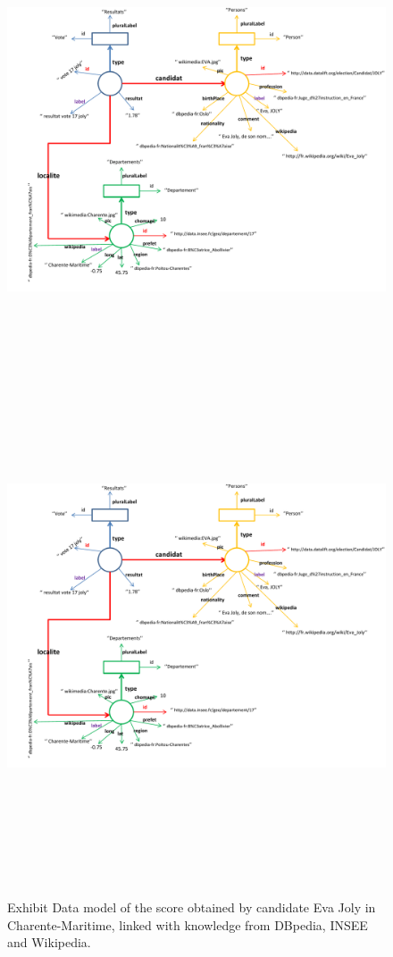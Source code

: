 \documentclass[a4paper,11pt]{report}
\begin{document}
\begin{landscape}
\begin{figure}[!htbp]
  \begin{center}
    \ifpdf
      \includegraphics[height=5in]{model_EvaJoly_data}
    \else
      \includegraphics[bb = 92 86 545 742, height=6in]{model_EvaJoly_data}
    \fi
    \caption{Exhibit Data model of the score obtained by candidate Eva Joly in Charente-Maritime, linked with knowledge from DBpedia, INSEE and Wikipedia. }
    \label{sampleModel}
  \end{center}
\end{figure}

\end{landscape}
\end{document}
